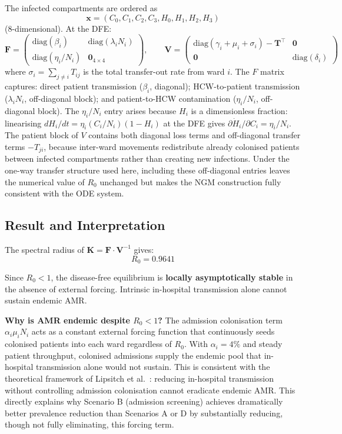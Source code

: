 \documentclass[12pt,a4paper]{article}
\begin{document}
The infected compartments are ordered as
\[
\mathbf{x} = (C_0, C_1, C_2, C_3, H_0, H_1, H_2, H_3)
\]
(8-dimensional). At the DFE:
\begin{equation}
\label{eq:4}
\mathbf{F}
=
\begin{pmatrix}
\mathrm{diag}(\beta_i) & \mathrm{diag}(\lambda_i N_i) \\
\mathrm{diag}(\eta_i/N_i) & \mathbf{0}_{4 \times 4}
\end{pmatrix},
\qquad
\mathbf{V}
=
\begin{pmatrix}
 \mathrm{diag}(\gamma_i + \mu_i + \sigma_i) - \mathbf{T}^{\top} & \mathbf{0} \\
 \mathbf{0} & \mathrm{diag}(\delta_i)
\end{pmatrix}
\end{equation}
where $\sigma_i = \sum_{j \neq i} T_{ij}$ is the total transfer-out rate from ward $i$. The $F$ matrix captures: direct patient transmission ($\beta_i$, diagonal); HCW-to-patient transmission ($\lambda_i N_i$, off-diagonal block); and patient-to-HCW contamination ($\eta_i/N_i$, off-diagonal block). The $\eta_i/N_i$ entry arises because $H_i$ is a dimensionless fraction: linearising $dH_i/dt = \eta_i(C_i/N_i)(1-H_i)$ at the DFE gives $\partial\dot{H}_i/\partial C_i = \eta_i/N_i$. The patient block of $V$ contains both diagonal loss terms and off-diagonal transfer terms $-T_{ji}$, because inter-ward movements redistribute already colonised patients between infected compartments rather than creating new infections. Under the one-way transfer structure used here, including these off-diagonal entries leaves the numerical value of $R_0$ unchanged but makes the NGM construction fully consistent with the ODE system.

\subsection{Result and Interpretation}

The spectral radius of $\mathbf{K} = \mathbf{F} \cdot \mathbf{V}^{-1}$ gives:
\begin{equation}
\label{eq:5}
\boxed{R_0 = 0.9641}
\end{equation}

Since $R_0 < 1$, the disease-free equilibrium is \textbf{locally asymptotically stable} in the absence of external forcing. Intrinsic in-hospital transmission alone cannot sustain endemic AMR.

\textbf{Why is AMR endemic despite $R_0 < 1$?} The admission colonisation term $\alpha_i \mu_i N_i$ acts as a constant external forcing function that continuously seeds colonised patients into each ward regardless of $R_0$. With $\alpha_i = 4\%$ and steady patient throughput, colonised admissions supply the endemic pool that in-hospital transmission alone would not sustain. This is consistent with the theoretical framework of Lipsitch et al.\ \cite{lipsitch2000}: reducing in-hospital transmission without controlling admission colonisation cannot eradicate endemic AMR. This directly explains why Scenario B (admission screening) achieves dramatically better prevalence reduction than Scenarios A or D by substantially reducing, though not fully eliminating, this forcing term.
\end{document}
